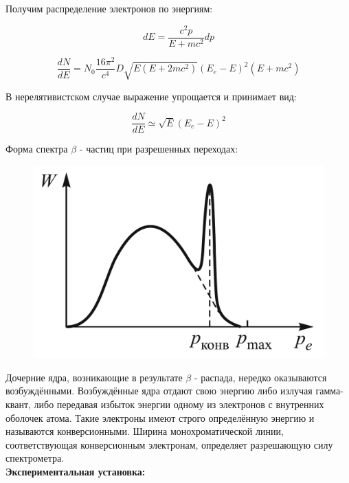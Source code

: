 \documentclass[a4paper, 12pt]{article}%
\begin{document}
	Получим распределение электронов по энергиям:
	
\[dE = \frac{c^2 p}{E + m c^2} dp\]

\[\frac{dN}{dE} = N_0 \frac{16 \pi^2}{c^4} D \sqrt{E(E + 2mc^2)}(E_e - E)^2(E + mc^2)\]

	В нерелятивистском случае выражение упрощается и принимает вид:

\[\frac{dN}{dE} \simeq \sqrt{E}(E_e - E)^2\]

	Форма спектра $\beta$ - частиц при разрешенных переходах:

	\begin{figure}[h!]
	    \centering
		\includegraphics[scale=0.15]{Спектр.PNG}
	\end{figure}
		
	Дочерние ядра,  возникающие в результате $\beta$ - распада,  нередко оказываются возбуждёнными.  Возбуждённые ядра отдают свою энергию либо излучая гамма-квант, либо передавая избыток энергии одному из электронов с внутренних оболочек атома. Такие электроны имеют строго определённую энергию и называются конверсионными. Ширина монохроматической линии,  соответствующая конверсионным электронам,  определяет разрешающую силу спектрометра. \\
		
\textbf{Экспериментальная установка:}\\\par
\end{document}
